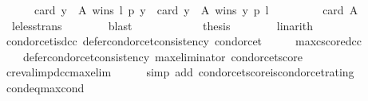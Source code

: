 \begin{isabellebody}
\isanewline
\ \ \ \ \ \ {\isachardoublequoteopen}card\ {\isacharbraceleft}{\kern0pt}y\ {\isasymin}\ A{\isachardot}{\kern0pt}\ wins\ l\ p\ y{\isacharbraceright}{\kern0pt}\ {\isacharminus}{\kern0pt}\ card\ {\isacharbraceleft}{\kern0pt}y\ {\isasymin}\ A{\isachardot}{\kern0pt}\ wins\ y\ p\ l{\isacharbraceright}{\kern0pt}\ {\isacharless}{\kern0pt}\isanewline
\ \ \ \ \ \ \ \ card\ A\ {\isacharminus}{\kern0pt}{}{\isachardoublequoteclose}\isanewline
\ \ \ \ \ \ \isamarkupfalse%
\ {\isachardoublequoteopen}{}{\isachardoublequoteclose}\ le{\isacharunderscore}{\kern0pt}less{\isacharunderscore}{\kern0pt}trans\isanewline
\ \ \ \ \ \ \isamarkupfalse%
\ blast\isanewline
\ \ \ \ \isamarkupfalse%
\ {}\isanewline
\ \ \ \ \isamarkupfalse%
\ {\isacharquery}{\kern0pt}thesis\isanewline
\ \ \ \ \ \ \isamarkupfalse%
\ linarith\isanewline
\ \ \isamarkupfalse%
\isanewline
{}\isamarkupfalse%
%
\endisatagproof
{\isafoldproof}%
%
\isadelimproof
\isanewline
%
\endisadelimproof
\isanewline
{}\isamarkupfalse%
\ condorcet{\isacharunderscore}{\kern0pt}is{\isacharunderscore}{\kern0pt}dcc{\isacharcolon}{\kern0pt}\ {\isachardoublequoteopen}defer{\isacharunderscore}{\kern0pt}condorcet{\isacharunderscore}{\kern0pt}consistency\ condorcet{\isachardoublequoteclose}\isanewline
%
\isadelimproof
%
\endisadelimproof
%
\isatagproof
{}\isamarkupfalse%
\ {\isacharminus}{\kern0pt}\isanewline
\ \ \isamarkupfalse%
\ max{\isacharunderscore}{\kern0pt}cscore{\isacharunderscore}{\kern0pt}dcc{\isacharcolon}{\kern0pt}\isanewline
\ \ \ \ {\isachardoublequoteopen}defer{\isacharunderscore}{\kern0pt}condorcet{\isacharunderscore}{\kern0pt}consistency\ {\isacharparenleft}{\kern0pt}max{\isacharunderscore}{\kern0pt}eliminator\ condorcet{\isacharunderscore}{\kern0pt}score{\isacharparenright}{\kern0pt}{\isachardoublequoteclose}\isanewline
\ \ \ \ \isamarkupfalse%
\ cr{\isacharunderscore}{\kern0pt}eval{\isacharunderscore}{\kern0pt}imp{\isacharunderscore}{\kern0pt}dcc{\isacharunderscore}{\kern0pt}max{\isacharunderscore}{\kern0pt}elim\isanewline
\ \ \ \ \isamarkupfalse%
\ {\isacharparenleft}{\kern0pt}simp\ add{\isacharcolon}{\kern0pt}\ condorcet{\isacharunderscore}{\kern0pt}score{\isacharunderscore}{\kern0pt}is{\isacharunderscore}{\kern0pt}condorcet{\isacharunderscore}{\kern0pt}rating{\isacharparenright}{\kern0pt}\isanewline
\ \ \isamarkupfalse%
\ cond{\isacharunderscore}{\kern0pt}eq{\isacharunderscore}{\kern0pt}max{\isacharunderscore}{\kern0pt}cond{\isacharcolon}{\kern0pt}\isanewline

\end{isabellebody}
